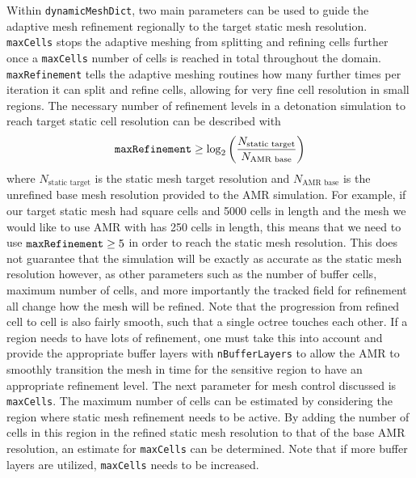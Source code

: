 Within \verb|dynamicMeshDict|, two main parameters can be used to guide the adaptive mesh refinement regionally to the target static mesh resolution. \verb|maxCells| stops the adaptive meshing from splitting and refining cells further once a \verb|maxCells| number of cells is reached in total throughout the domain. \verb|maxRefinement| tells the adaptive meshing routines how many further times per iteration it can split and refine cells, allowing for very fine cell resolution in small regions. The necessary number of refinement levels in a detonation simulation to reach target static cell resolution can be described with 
\begin{equation}
\verb|maxRefinement| \geq \log_2\left(\frac{N_{\text{static target}}}{N_{\text{AMR base}}}\right)
\end{equation}
where \(N_{\text{static target}}\) is the static mesh target resolution and \(N_{\text{AMR base}}\) is the unrefined base mesh resolution provided to the AMR simulation. For example, if our target static mesh had square cells and 5000 cells in length and the mesh we would like to use AMR with has 250 cells in length, this means that we need to use \(\verb|maxRefinement|\geq 5\) in order to reach the static mesh resolution. This does not guarantee that the simulation will be exactly as accurate as the static mesh resolution however, as other parameters such as the number of buffer cells, maximum number of cells, and more importantly the tracked field for refinement all change how the mesh will be refined. Note that the progression from refined cell to cell is also fairly smooth, such that a single octree touches each other. If a region needs to have lots of refinement, one must take this into account and provide the appropriate buffer layers with \verb|nBufferLayers| to allow the AMR to smoothly transition the mesh in time for the sensitive region to have an appropriate refinement level. The next parameter for mesh control discussed is \verb|maxCells|. 
The maximum number of cells can be estimated by considering the region where static mesh refinement needs to be active. By adding the number of cells in this region in the refined static mesh resolution to that of the base AMR resolution, an estimate for \verb|maxCells| can be determined. Note that if more buffer layers are utilized, \verb|maxCells| needs to be increased. 


